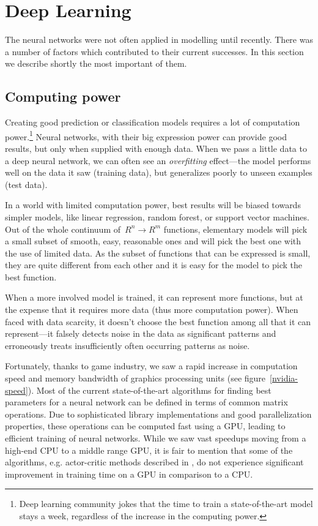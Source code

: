 \section{Deep Learning}
The neural networks were not often applied in modelling until recently. There was a number of factors which contributed to their current successes. In this section we describe shortly the most important of them.

\subsection{Computing power}
Creating good prediction or classification models requires a lot of computation power.\footnote{Deep learning community jokes that the time to train a state-of-the-art model stays a week, regardless of the increase in the computing power.} Neural networks, with their big expression power can provide good results, but only when supplied with enough data. When we pass a little data to a deep neural network, we can often see an \emph{overfitting} effect---the model performs well on the data it saw (training data), but generalizes poorly to unseen examples (test data).

In a world with limited computation power, best results will be biased towards simpler models, like linear regression, random forest, or support vector machines. Out of the whole continuum of~$R^n \rightarrow R^m$ functions, elementary models will pick a small subset of smooth, easy, reasonable ones and will pick the best one with the use of limited data. As the subset of functions that can be expressed is small, they are quite different from each other and it is easy for the model to pick the best function.

When a more involved model is trained, it can represent more functions, but at the expense that it requires more data (thus more computation power). When faced with data scarcity, it doesn't choose the best function among all that it can represent---it falsely detects noise in the data as significant patterns and erroneously treats insufficiently often occurring patterns as noise.

Fortunately, thanks to game industry, we saw a rapid increase in computation speed and memory bandwidth of graphics processing units (see figure~\ref{nvidia-speed}). Most of the current state-of-the-art algorithms for finding best parameters for a neural network can be defined in terms of common matrix operations. Due to sophisticated library implementations and good parallelization properties, these operations can be computed fast using a GPU, leading to efficient training of neural networks. While we saw vast speedups moving from a high-end CPU to a middle range GPU, it is fair to mention that some of the algorithms, e.g. actor-critic methods described in \cite{a3c}, do not experience significant improvement in training time on a GPU in comparison to a CPU.

